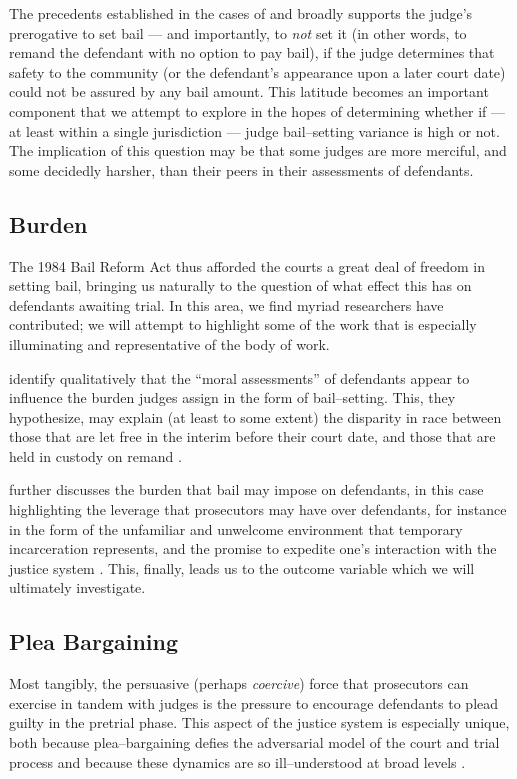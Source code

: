 The precedents established in the cases of
\citet{1984schall} and
\citet{1987united} broadly supports the judge's prerogative to set bail
--- and importantly, to \textit{not} set it
(in other words, to remand the defendant with no option to pay bail),
if the judge determines that safety to the community
(or the defendant's appearance upon a later court date)
could not be assured by any bail amount.
This latitude becomes an important component that we attempt to explore
in the hopes of determining whether if
--- at least within a single jurisdiction ---
judge bail--setting variance is high or not.
The implication of this question may be that
some judges are more merciful,
and some decidedly harsher,
than their peers in their assessments of defendants.




\subsection{\nmu Burden}\label{subsec:burden}
The 1984 Bail Reform Act thus
afforded the courts a great deal of freedom in setting bail,
bringing us naturally to the question of what effect this has on defendants awaiting trial.
In this area, we find myriad researchers have contributed;
we will attempt to highlight some of the work that is
especially illuminating and
representative of the body of work.

\citeauthor{kellough2002remand} identify qualitatively that the
``moral assessments'' of defendants appear to influence the burden judges assign in the form of bail--setting.
This, they hypothesize, may explain
(at least to some extent)
the disparity in race between
those that are let free in the interim before their court date, and
those that are held in custody on remand
\citep{kellough2002remand}.

\citeauthor{zacharias1997justice} further discusses the burden that bail may impose on defendants,
in this case highlighting the leverage that prosecutors may have over defendants,
for instance in the form of the unfamiliar and unwelcome environment
that temporary incarceration represents, and the promise to expedite one's interaction with the justice system
\citep{zacharias1997justice}.
This, finally, leads us to the outcome variable which we will ultimately investigate.


\subsection{\nmu Plea \nmu Bargaining}\label{subsec:plea}
Most tangibly, the persuasive
(perhaps \textit{coercive})
force that prosecutors can exercise in tandem with judges is
the pressure to encourage defendants to plead guilty in the pretrial phase.
This aspect of the justice system is especially unique, both because
plea--bargaining defies the adversarial model of the court and trial process and because
these dynamics are so ill--understood at broad levels
\citep{zacharias1997justice}.


